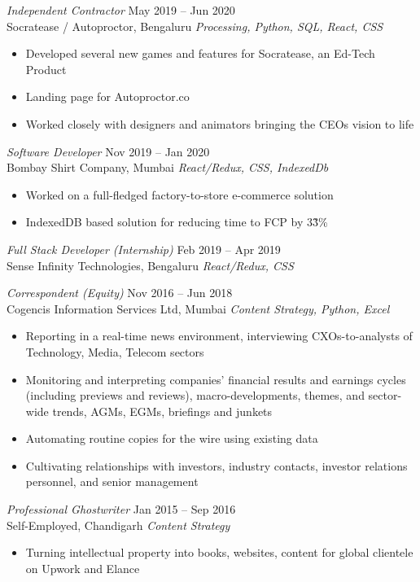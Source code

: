 \documentclass[margin, 10pt]{res} %
\begin{document}
\begin{resume}
{\sl Independent Contractor} \hfill May 2019 – Jun 2020 \\
Socratease / Autoproctor, Bengaluru \hfill {\scriptsize \it Processing, Python, SQL, React, CSS}
\begin{itemize}
\item Developed several new games and features for Socratease, an Ed-Tech Product
\item Landing page for Autoproctor.co
\item Worked closely with designers and animators bringing the CEOs vision to life 
\end{itemize}

{\sl Software Developer} \hfill Nov 2019 – Jan 2020 \\
Bombay Shirt Company, Mumbai \hfill {\scriptsize \it React/Redux, CSS, IndexedDb}
\begin{itemize}
\item Worked on a full-fledged factory-to-store e-commerce solution
\item IndexedDB based solution for reducing time to FCP by 3\~3\%
\end{itemize}
{\sl Full Stack Developer (Internship)} \hfill Feb 2019 – Apr 2019 \\
Sense Infinity Technologies, Bengaluru \hfill {\scriptsize \it React/Redux, CSS}

{\sl Correspondent (Equity)} \hfill Nov 2016 – Jun 2018 \\
Cogencis Information Services Ltd, Mumbai \hfill {\scriptsize \it Content Strategy, Python, Excel}
\begin{itemize}
\item Reporting in a real-time news environment, interviewing CXOs-to-analysts of Technology, Media, Telecom sectors
\item Monitoring and interpreting companies’ financial results and earnings cycles (including previews and reviews), macro-developments, themes, and sector-wide trends, AGMs, EGMs, briefings and junkets
\item Automating routine copies for the wire using existing data
\item Cultivating relationships with investors, industry contacts, investor relations personnel, and senior management

\end{itemize}

{\sl Professional Ghostwriter} \hfill Jan 2015 – Sep 2016 \\
Self-Employed, Chandigarh \hfill {\scriptsize \it Content Strategy}
\begin{itemize}
\item Turning intellectual property into books, websites, content for global clientele on Upwork and Elance
\end{itemize}


\end{resume}
\end{document}
